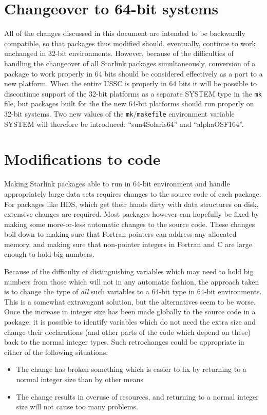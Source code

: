 \documentclass[twoside,11pt]{article}
\newcommand{\xref}[3]{#1}
\renewcommand{\_}{\texttt{\symbol{95}}}
\begin{document}
\section{Changeover to 64-bit systems}

All of the changes discussed in this document
are intended to be backwardly compatible, 
so that packages thus modified should, eventually, 
continue to work unchanged in 32-bit environments.
However, because of the difficulties of handling the changeover of all 
Starlink packages simultaneously, conversion of a package
to work properly in 64 bits should be considered effectively as
a port to a new platform.  
When the entire USSC is properly in 64 bits it will be possible
to discontinue support of the 32-bit platforms as a separate SYSTEM
type in the {\tt mk} file, but packages built for the the new 
64-bit platforms should run properly on 32-bit systems.
Two new values of the {\tt mk}/{\tt makefile} environment variable 
SYSTEM will therefore be introduced: 
``sun4\_Solaris\_64'' and ``alpha\_OSF1\_64''.



\section{Modifications to code}

Making Starlink packages able to run in 64-bit environment and 
handle appropriately large data sets requires changes to the source
code of each package.
For packages like \xref{HDS}{sun92}{}, 
which get their hands dirty with data structures on disk,
extensive changes are required.
Most packages however can hopefully be fixed by making some more-or-less
automatic changes to the source code.
These changes boil down to making sure that Fortran pointers 
can address any allocated memory,
and making sure that non-pointer integers in Fortran and C 
are large enough to hold big numbers.

Because of the difficulty of distinguishing variables which may 
need to hold big numbers from those which will not in any automatic
fashion, the approach taken is to change the type of {\em all\/} 
such variables to a 64-bit type in 64-bit environments.
This is a somewhat extravagant solution,
but the alternatives seem to be worse.
Once the increase in integer size has been made 
globally to the source code in a package,
it is possible to identify variables which do not need the extra size
and change their declarations (and other parts of the code which depend
on these) back to the normal integer types.
Such retrochanges could be appropriate in either of the following situations:
\begin{itemize}
\item
The change has broken something which is easier to fix by returning to 
a normal integer size than by other means
\item
The change results in overuse of resources, and returning to a normal
integer size will not cause too many problems.
\end{itemize}
\end{document}

